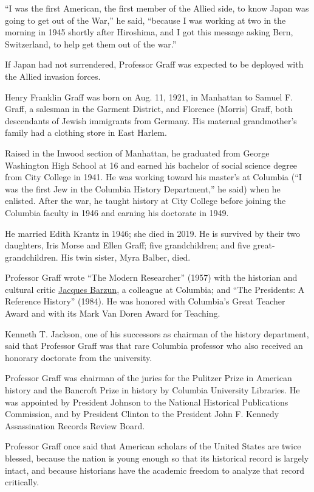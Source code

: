 ``I was the first American, the first member of the Allied side, to know
Japan was going to get out of the War,'' he said, ``because I was
working at two in the morning in 1945 shortly after Hiroshima, and I got
this message asking Bern, Switzerland, to help get them out of the
war.''

If Japan had not surrendered, Professor Graff was expected to be
deployed with the Allied invasion forces.

Henry Franklin Graff was born on Aug. 11, 1921, in Manhattan to Samuel
F. Graff, a salesman in the Garment District, and Florence (Morris)
Graff, both descendants of Jewish immigrants from Germany. His maternal
grandmother's family had a clothing store in East Harlem.

Raised in the Inwood section of Manhattan, he graduated from George
Washington High School at 16 and earned his bachelor of social science
degree from City College in 1941. He was working toward his master's at
Columbia (``I was the first Jew in the Columbia History Department,'' he
said) when he enlisted. After the war, he taught history at City College
before joining the Columbia faculty in 1946 and earning his doctorate in
1949.

He married Edith Krantz in 1946; she died in 2019. He is survived by
their two daughters, Iris Morse and Ellen Graff; five grandchildren; and
five great-grandchildren. His twin sister, Myra Balber, died.

Professor Graff wrote ``The Modern Researcher'' (1957) with the
historian and cultural critic
\href{https://www.nytimes3xbfgragh.onion/2012/10/26/arts/jacques-barzun-historian-and-scholar-dies-at-104.html}{Jacques
Barzun}, a colleague at Columbia; and ``The Presidents: A Reference
History'' (1984). He was honored with Columbia's Great Teacher Award and
with its Mark Van Doren Award for Teaching.

Kenneth T. Jackson, one of his successors as chairman of the history
department, said that Professor Graff was that rare Columbia professor
who also received an honorary doctorate from the university.

Professor Graff was chairman of the juries for the Pulitzer Prize in
American history and the Bancroft Prize in history by Columbia
University Libraries. He was appointed by President Johnson to the
National Historical Publications Commission, and by President Clinton to
the President John F. Kennedy Assassination Records Review Board.

Professor Graff once said that American scholars of the United States
are twice blessed, because the nation is young enough so that its
historical record is largely intact, and because historians have the
academic freedom to analyze that record critically.

